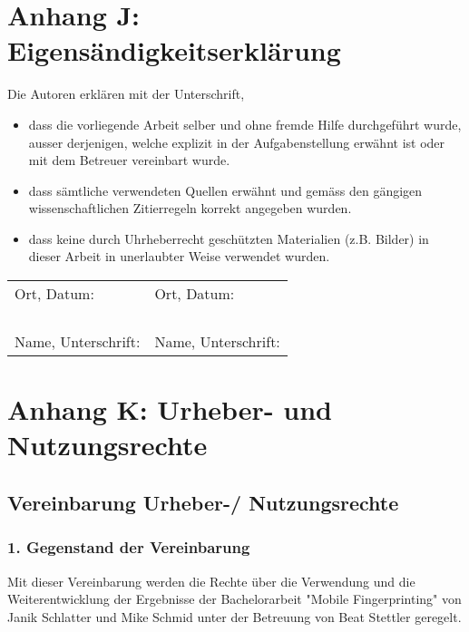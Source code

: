 \cleardoublepage
\chapter{Anhang J: Eigensändigkeitserklärung}

Die Autoren erklären mit der Unterschrift,
\begin{itemize}
\item dass die vorliegende Arbeit selber und ohne fremde Hilfe durchgeführt wurde,
ausser derjenigen, welche explizit in der Aufgabenstellung erwähnt ist oder mit 
dem Betreuer vereinbart wurde.
\item dass sämtliche verwendeten Quellen erwähnt und gemäss den gängigen 
wissenschaftlichen Zitierregeln korrekt angegeben wurden.
\item dass keine durch Uhrheberrecht geschützten Materialien 
(z.B. Bilder) in dieser Arbeit in unerlaubter Weise verwendet wurden.
\newline
\newline
\newline
\newline
\end{itemize}

\begin{tabularx}{\textwidth}{XX}
Ort, Datum: & Ort, Datum: \\
& \\
& \\
& \\
& \\
Name, Unterschrift: & Name, Unterschrift: \\
\end{tabularx}

\cleardoublepage
\chapter{Anhang K: Urheber- und Nutzungsrechte}

\clearpage 

\section*{Vereinbarung Urheber-/ Nutzungsrechte}
\subsection*{1. Gegenstand der Vereinbarung}
    Mit dieser Vereinbarung werden die Rechte über die Verwendung und die 
    Weiterentwicklung der Ergebnisse der Bachelorarbeit "Mobile Fingerprinting" von 
    Janik Schlatter und Mike Schmid unter der Betreuung von Beat Stettler geregelt.

